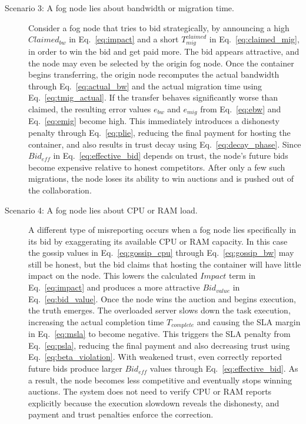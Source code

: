 \documentclass{article}
\begin{document}
\begin{description}
\item[Scenario 3: A fog node lies about bandwidth or migration time.]
Consider a fog node that tries to bid strategically, by announcing a high \(Claimed_{bw}\) in Eq.~\ref{eq:impact} and a short \(T^{claimed}_{mig}\) in Eq.~\ref{eq:claimed_mig}, in order to win the bid and get paid more. The bid appears attractive, and the node may even be selected by the origin fog node. Once the container begins transferring, the origin node recomputes the actual bandwidth through Eq.~\ref{eq:actual_bw} and the actual migration time using Eq.~\ref{eq:tmig_actual}. If the transfer behaves significantly worse than claimed, the resulting error values \(e_{bw}\) and \(e_{mig}\) from Eq.~\ref{eq:ebw} and Eq.~\ref{eq:emig} become high. This immediately introduces a dishonesty penalty through Eq.~\ref{eq:plie}, reducing the final payment for hosting the container, and also results in trust decay using Eq.~\ref{eq:decay_phase}. Since \(Bid_{eff}\) in Eq.~\ref{eq:effective_bid} depends on trust, the node’s future bids become expensive relative to honest competitors. After only a few such migrations, the node loses its ability to win auctions and is pushed out of the collaboration.

\item[Scenario 4: A fog node lies about CPU or RAM load.]
A different type of misreporting occurs when a fog node lies specifically in its bid by exaggerating its available CPU or RAM capacity. In this case the gossip values in Eq.~\ref{eq:gossip_cpu} through Eq.~\ref{eq:gossip_bw} may still be honest, but the bid claims that hosting the container will have little impact on the node. This lowers the calculated \(Impact\) term in Eq.~\ref{eq:impact} and produces a more attractive \(Bid_{value}\) in Eq.~\ref{eq:bid_value}. Once the node wins the auction and begins execution, the truth emerges. The overloaded server slows down the task execution, increasing the actual completion time \(T_{complete}\) and causing the SLA margin in Eq.~\ref{eq:msla} to become negative. This triggers the SLA penalty from Eq.~\ref{eq:psla}, reducing the final payment and also decreasing trust using Eq.~\ref{eq:beta_violation}. With weakened trust, even correctly reported future bids produce larger \(Bid_{eff}\) values through Eq.~\ref{eq:effective_bid}. As a result, the node becomes less competitive and eventually stops winning auctions. The system does not need to verify CPU or RAM reports explicitly because the execution slowdown reveals the dishonesty, and payment and trust penalties enforce the correction.


\end{description}
\end{document}
